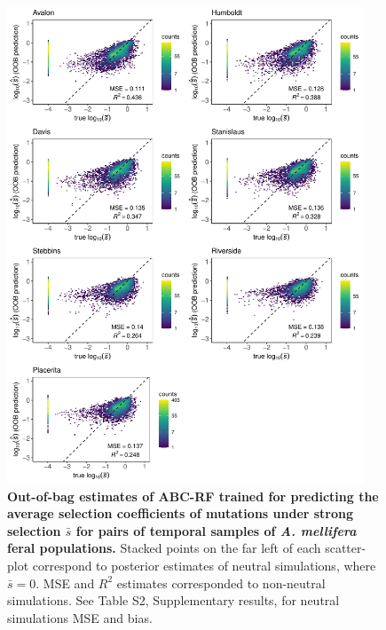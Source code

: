 \documentclass[a4paper, 12pt]{article}
\begin{document}
\begin{figure}[ht]
 \centering
 \includegraphics[width=0.95\textwidth]{Figures/FigureS21_combined_plot_gammasel.pdf}
 \small\caption{\textbf{Out-of-bag estimates of ABC-RF trained for predicting the average selection coefficients of mutations under strong selection $\bar{s}$ for pairs of temporal samples of \textit{A. mellifera} feral populations.} Stacked points on the far left of each scatter-plot correspond to posterior estimates of neutral simulations, where $\bar{s} = 0$. MSE and $R^2$ estimates corresponded to non-neutral simulations. See Table S2, Supplementary results, for neutral simulations MSE and bias.}
 \label{fig:supple_feralbee_gammaselmean}
\end{figure}
\end{document}
